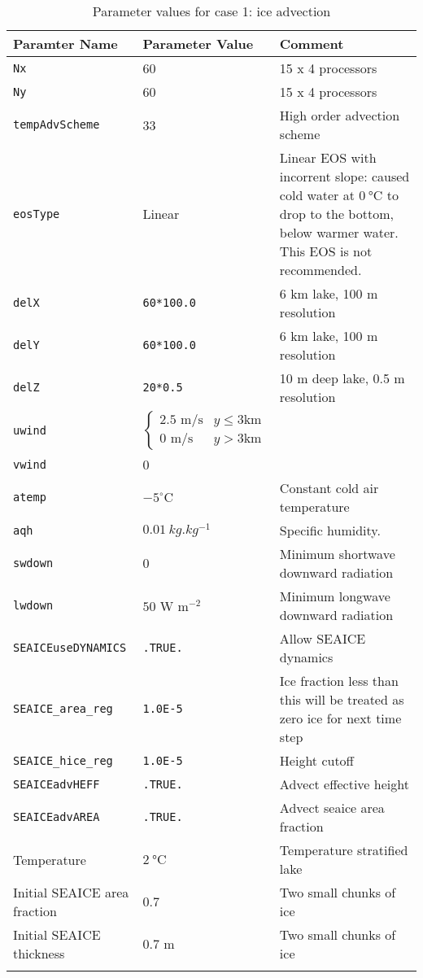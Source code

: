 \documentclass[11pt]{article}
\begin{document}
\begin{longtable}{  p{}  p{}  p{}  }
\hline
\textbf{Paramter Name} & \textbf{Parameter Value} & \textbf{Comment} \\ \hline
\verb|Nx| & 60 & 15 x 4 processors \\ \hline
\verb|Ny| & 60 & 15 x 4 processors \\ \hline
\verb|tempAdvScheme|	&	33	&	High order advection scheme \\ \hline
\verb|eosType|		&	Linear	&	Linear EOS with incorrent slope: caused cold water at $\SI{0}{\celsius}$ to drop to the bottom, below warmer water. This EOS is not recommended. \\ \hline
\verb|delX|			&	\verb|60*100.0|	&	6 km lake, 100 m resolution \\ \hline
\verb|delY|			&	\verb|60*100.0|	&	6 km lake, 100 m resolution \\ \hline
\verb|delZ|			&	\verb|20*0.5|	&	10 m deep lake, 0.5 m resolution \\ \hline

\verb|uwind|		&	\begin{equation*} \begin{cases} 2.5 \text{ m/s} & y \leq 3 \text{km} \\ 0 \text{ m/s} & y > 3 \text{km}   \end{cases} \end{equation*} & \\ \hline
\verb|vwind| 	& 0	& \\ \hline
\verb|atemp| 	& $-5^{\circ} \text{C}$		& Constant cold air temperature \\ \hline
\verb|aqh| 		& $\SI{0.01}{kg.kg^{-1}}$		&	Specific humidity.\\ \hline
\verb|swdown| 	& $0$	& Minimum shortwave downward radiation \\ \hline
\verb|lwdown| 	& $50 \text{ W} \text{ m}^{-2}$	& Minimum longwave downward radiation \\ \hline

\verb|SEAICEuseDYNAMICS| & \verb|.TRUE.| & Allow SEAICE dynamics \\ \hline
\verb|SEAICE_area_reg|   & \verb|1.0E-5| & Ice fraction less than this will be treated as zero ice for next time step \\ \hline
\verb|SEAICE_hice_reg|   & \verb|1.0E-5| & Height cutoff \\ \hline
\verb|SEAICEadvHEFF|     & \verb|.TRUE.| & Advect effective height \\ \hline
\verb|SEAICEadvAREA|     & \verb|.TRUE.| & Advect seaice area fraction \\ \hline

Temperature & $\SI{2}{\celsius}$ & Temperature stratified lake \\ \hline
Initial SEAICE area fraction   & $0.7$ & Two small chunks of ice \\ \hline
Initial SEAICE thickness    & $0.7 \text{ m}$ & Two small chunks of ice \\ \hline

\caption{Parameter values for case 1: ice advection}
\label{table:iceAdvect}
\end{longtable}
\end{document}
